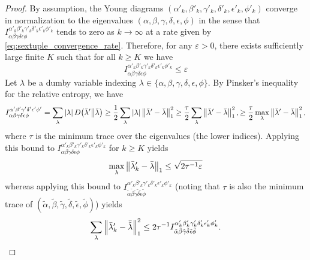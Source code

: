 \documentclass[notitlepage, 10pt]{article}
\begin{document}
\begin{proof}
    By assumption, the Young diagrams $(\alpha'_k, \beta'_k, \gamma'_k, \delta'_k, \epsilon'_k, \phi'_k)$ converge in normalization to the eigenvalues $(\alpha,\beta,\gamma,\delta,\epsilon,\phi)$ in the sense that $I_{\alpha\beta\gamma\delta\epsilon\phi}^{\alpha'_k\beta'_k\gamma'_k\delta'_k\epsilon'_k\phi'_k}$ tends to zero as $k\to \infty$ at a rate given by \cref{eq:sextuple_convergence_rate}.
    Therefore, for any $\varepsilon > 0$, there exists sufficiently large finite $K$ such that for all $k \geq K$ we have
    \begin{equation}
        I_{\alpha\beta\gamma\delta\epsilon\phi}^{\alpha'_k\beta'_k\gamma'_k\delta'_k\epsilon'_k\phi'_k} \leq \varepsilon 
    \end{equation}
    Let $\lambda$ be a dumby variable indexing $\lambda \in \{\alpha,\beta,\gamma,\delta,\epsilon,\phi\}$.
    By Pinsker's inequality for the relative entropy, we have
    \begin{align}
        I^{\alpha'\beta'\gamma'\delta'\epsilon'\phi'}_{\alpha\beta\gamma\delta\epsilon\phi}
        = \sum_{\lambda} \left|\lambda\right| D\!\left(\bar \lambda'\middle\|\bar \lambda\right)
        \geq \frac{1}{2}\sum_{\lambda} \left|\lambda\right| \left\lVert\bar \lambda' - \bar \lambda\right\rVert_{1}^{2}
        \geq \frac{\tau}{2} \sum_{\lambda} \left\lVert\bar \lambda' - \bar \lambda\right\rVert_{1}^{2},
        \geq \frac{\tau}{2} \max_{\lambda} \left\lVert\bar \lambda' - \bar \lambda\right\rVert_{1}^{2},
    \end{align}
    where $\tau$ is the minimum trace over the eigenvalues (the lower indices).
    Applying this bound to $I_{\alpha\beta\gamma\delta\epsilon\phi}^{\alpha'_k\beta'_k\gamma'_k\delta'_k\epsilon'_k\phi'_k}$ for $k \geq K$ yields
    \begin{equation}
        \max_{\lambda}\left\lVert\bar \lambda_k' - \bar \lambda\right\rVert_{1} \leq \sqrt{2 \tau^{-1} \varepsilon}
    \end{equation}
    whereas applying this bound to $I_{\tilde \alpha\tilde \beta \tilde \gamma\tilde \delta\tilde \epsilon\tilde \phi}^{\alpha'_k\beta'_k\gamma'_k\delta'_k\epsilon'_k\phi'_k}$ (noting that $\tau$ is also the minimum trace of $(\tilde \alpha,\tilde \beta, \tilde \gamma, \tilde \delta, \tilde \epsilon, \tilde \phi)$) yields
    \begin{equation}
        \sum_{\lambda} \norm{\bar \lambda'_k - \bar {\tilde \lambda}}_{1}^2 \leq 2 \tau^{-1}I^{\alpha'_k\beta'_k\gamma'_k\delta'_k\epsilon'_k\phi'_k}_{\tilde \alpha \tilde \beta\tilde \gamma\tilde \delta\tilde \epsilon\tilde \phi}.

\end{equation}
\end{proof}
\end{document}
